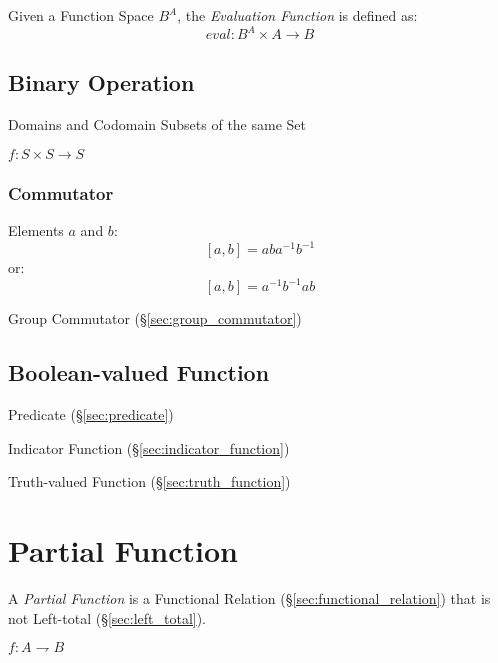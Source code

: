 Given a Function Space $B^A$, the \emph{Evaluation Function} is
defined as:
\[
  eval : B^A \times A \rightarrow B
\]



\subsection{Binary Operation}\label{sec:binary_operation}

Domains and Codomain Subsets of the same Set

$f : S \times S \rightarrow S$



\subsubsection{Commutator}\label{sec:commutator}

Elements $a$ and $b$:
\[
  [a,b] = aba^{-1}b^{-1}
\]
or:
\[
  [a,b] = a^{-1}b^{-1}ab
\]

Group Commutator (\S\ref{sec:group_commutator})



\subsection{Boolean-valued Function}\label{sec:boolean_function}

Predicate (\S\ref{sec:predicate})

Indicator Function (\S\ref{sec:indicator_function})

Truth-valued Function (\S\ref{sec:truth_function})



\section{Partial Function}\label{sec:partial_function}

A \emph{Partial Function} is a Functional Relation
(\S\ref{sec:functional_relation}) that is not Left-total
(\S\ref{sec:left_total}).

$f : A \rightharpoondown B$



